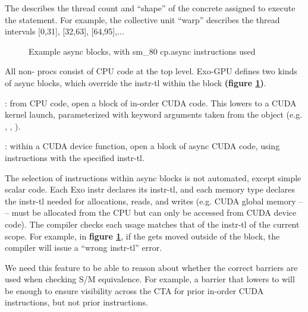 \filbreak
The  describes the thread count and ``shape'' of the concrete  assigned to execute the statement.
For example, the collective unit ``warp'' describes the thread intervals [0,31], [32,63], [64,95],...

\filbreak
{}


\begin{figure}[!b]

\caption{Example async blocks, with sm\_80 cp.async instructions used}
\label{fig:AsyncBlocks}
\end{figure}

All non- procs consist of CPU code at the top level.
Exo-GPU defines two kinds of async blocks, which override the instr-tl within the block \textbf{(figure \ref{fig:AsyncBlocks})}.

\filbreak
{}: from CPU code, open a block of in-order CUDA code.
This lowers to a CUDA kernel launch, parameterized with keyword arguments taken from the  object (e.g. , , ).

\filbreak
{}: within a CUDA device function, open a block of async CUDA code, using instructions with the specified instr-tl.

\filbreak
The selection of instructions within async blocks is not automated, except simple scalar code.
Each Exo instr declares its instr-tl, and each memory type declares the instr-tl needed for allocations, reads, and writes (e.g. CUDA global memory --  -- must be allocated from the CPU but can only be accessed from CUDA device code).
The compiler checks each usage matches that of the instr-tl of the current scope.
For example, in \textbf{figure \ref{fig:AsyncBlocks}}, if the  gets moved outside of the  block, the compiler will issue a ``wrong instr-tl'' error.

 We need this feature to be able to reason about whether the correct barriers are used when checking S/M equivalence. For example, a barrier that lowers to  will be enough to ensure visibility across the CTA for prior in-order CUDA instructions, but not prior  instructions.

